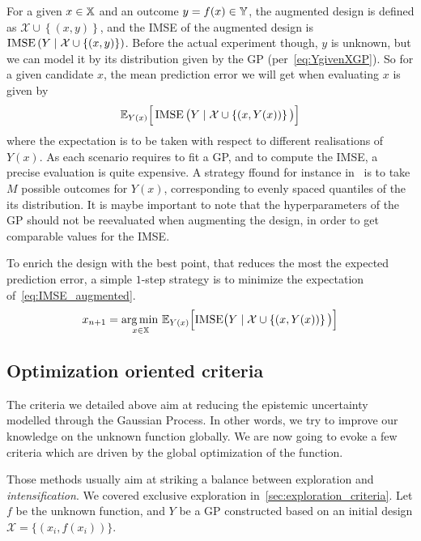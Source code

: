 \documentclass[../../Main_ManuscritThese.tex]{subfiles}
\begin{document}
For a given $x\in \mathbb{X}$ and an outcome $y=f(x)\in\mathbb{Y}$, the augmented design is defined as $\mathcal{X} \cup \left\{(x, y)\right\}$, and the IMSE of the augmented design is $\operatorname{\mathrm{IMSE}}\left(Y \mid \mathcal{X} \cup \left\{(x, y)\right\} \right)$.
Before the actual experiment though, $y$ is unknown, but we can model it by its distribution given by the GP (per~\cref{eq:YgivenXGP}). So for a given candidate $x$, the mean prediction error we will get when evaluating $x$ is given by
\begin{equation}
  \label{eq:IMSE_augmented}
  \mathbb{E}_{Y(x)}\Big[\operatorname{\mathrm{IMSE}}\big(Y \mid \mathcal{X} \cup \left\{(x, Y(x))\right\} \big)\Big]
\end{equation}
where the expectation is to be taken with respect to different realisations of $Y(x)$. As each scenario requires to fit a GP, and to compute the IMSE, a precise evaluation is quite expensive. A strategy ffound for instance in~\cite{villemonteix_informational_2006} is to take $M$ possible outcomes for $Y(x)$, corresponding to evenly spaced quantiles of the its distribution.
It is maybe important to note that the hyperparameters of the GP should not be reevaluated when augmenting the design, in order to get comparable values for the IMSE.

To enrich the design with the best point, that reduces the most the expected prediction error, a simple $1$-step strategy is to minimize the expectation of~\cref{eq:IMSE_augmented}.
\begin{equation}
  x_{n+1} = \operatorname*{arg\,min \,}_{x\in \mathbb{X}}\mathbb{E}_{Y(x)}\Big[\mathrm{IMSE} \big(Y \mid \mathcal{X} \cup \left\{(x, Y(x))\right\} \big)\Big]
\end{equation}


\subsection{Optimization oriented criteria}
\label{sec:GP_optimization_criteria}
The criteria we detailed above aim at reducing the epistemic uncertainty modelled through the Gaussian Process. In other words, we try to improve our knowledge on the unknown function globally. We are now going to evoke a few criteria which are driven by the global optimization of the function.

Those methods usually aim at striking a balance between exploration and \emph{intensification}. We covered exclusive exploration in~\cref{sec:exploration_criteria}.
Let $f$ be the unknown function, and $Y$ be a GP constructed based on an initial design $\mathcal{X} = \{(x_i, f(x_i))\}$.
\end{document}
